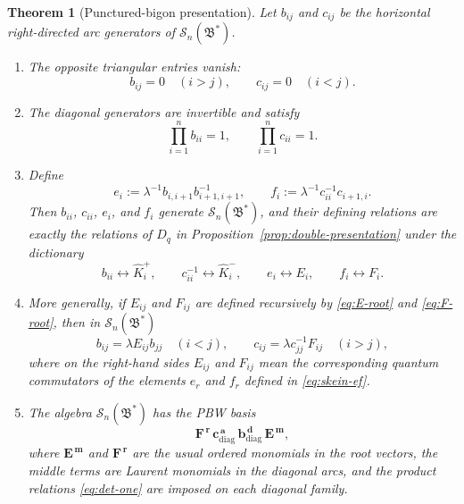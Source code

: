 \documentclass[11pt]{amsart}
\numberwithin{equation}{section}
\newtheorem{theorem}[equation]{Theorem}
\theoremstyle{definition}
\theoremstyle{remark}
\newcommand{\bcS}{\mathcal{S}}
\newcommand{\fB}{\mathfrak{B}}
\begin{document}
\begin{theorem}[Punctured-bigon presentation]
\label{thm:punctured-bigon}
Let \(b_{ij}\) and \(c_{ij}\) be the horizontal right-directed arc generators
of \(\bcS_n(\fB^*)\).

\begin{enumerate}
\item The opposite triangular entries vanish:
\begin{equation}\label{eq:triangular}
b_{ij}=0\quad(i>j),
\qquad
c_{ij}=0\quad(i<j).
\end{equation}

\item The diagonal generators are invertible and satisfy
\begin{equation}\label{eq:det-one}
\prod_{i=1}^{n}b_{ii}=1,
\qquad
\prod_{i=1}^{n}c_{ii}=1.
\end{equation}

\item Define
\begin{equation}\label{eq:skein-ef}
e_i:=\lambda^{-1}b_{i,i+1}b_{i+1,i+1}^{-1},
\qquad
f_i:=\lambda^{-1}c_{ii}^{-1}c_{i+1,i}.
\end{equation}
Then \(b_{ii}\), \(c_{ii}\), \(e_i\), and \(f_i\) generate
\(\bcS_n(\fB^*)\), and their defining relations are exactly the relations of
\(D_q\) in Proposition~\ref{prop:double-presentation} under the dictionary
\[
b_{ii}\longleftrightarrow \widehat K_i^{+},
\qquad
c_{ii}^{-1}\longleftrightarrow \widehat K_i^{-},
\qquad
e_i\longleftrightarrow E_i,
\qquad
f_i\longleftrightarrow F_i.
\]

\item More generally, if \(E_{ij}\) and \(F_{ij}\) are defined recursively by
\eqref{eq:E-root} and \eqref{eq:F-root}, then in \(\bcS_n(\fB^*)\)
\begin{equation}\label{eq:skein-root-coordinates}
b_{ij}=\lambda E_{ij}b_{jj}\quad(i<j),
\qquad
c_{ij}=\lambda c_{jj}^{-1}F_{ij}\quad(i>j),
\end{equation}
where on the right-hand sides \(E_{ij}\) and \(F_{ij}\) mean the corresponding
quantum commutators of the elements \(e_r\) and \(f_r\) defined in
\eqref{eq:skein-ef}.

\item The algebra \(\bcS_n(\fB^*)\) has the PBW basis
\begin{equation}\label{eq:skein-PBW}
\mathbf F^{\,\mathbf r}\,
\mathbf c_{\mathrm{diag}}^{\,\mathbf a}\,
\mathbf b_{\mathrm{diag}}^{\,\mathbf d}\,
\mathbf E^{\,\mathbf m},
\end{equation}
where \(\mathbf E^{\,\mathbf m}\) and \(\mathbf F^{\,\mathbf r}\) are the usual
ordered monomials in the root vectors, the middle terms are Laurent monomials
in the diagonal arcs, and the product relations \eqref{eq:det-one} are imposed
on each diagonal family.
\end{enumerate}
\end{theorem}
\end{document}
